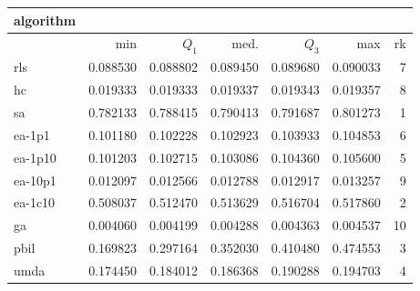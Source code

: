 \begin{tabular}{@{}l*{5}{>{{}}N{1}{3}}>{{}}N{2}{0}@{}}
\toprule
{algorithm} &  \\
\midrule
& {min} & {$Q_1$} & {med.} & {$Q_3$} & {max} & {rk}\\
\midrule
rls & 0.088530 & 0.088802 & 0.089450 & 0.089680 & 0.090033 & 7\\
hc & 0.019333 & 0.019333 & 0.019337 & 0.019343 & 0.019357 & 8\\
sa & {\color{blue}} 0.782133 & {\color{blue}} 0.788415 & {\color{blue}} 0.790413 & {\color{blue}} 0.791687 & {\color{blue}} 0.801273 & 1\\
ea-1p1 & 0.101180 & 0.102228 & 0.102923 & 0.103933 & 0.104853 & 6\\
ea-1p10 & 0.101203 & 0.102715 & 0.103086 & 0.104360 & 0.105600 & 5\\
ea-10p1 & 0.012097 & 0.012566 & 0.012788 & 0.012917 & 0.013257 & 9\\
ea-1c10 & 0.508037 & 0.512470 & 0.513629 & 0.516704 & 0.517860 & 2\\
ga & 0.004060 & 0.004199 & 0.004288 & 0.004363 & 0.004537 & 10\\
pbil & 0.169823 & 0.297164 & 0.352030 & 0.410480 & 0.474553 & 3\\
umda & 0.174450 & 0.184012 & 0.186368 & 0.190288 & 0.194703 & 4\\
\bottomrule
\end{tabular}

